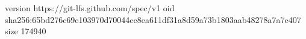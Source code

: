 version https://git-lfs.github.com/spec/v1
oid sha256:65bd276c69c103970d70044cc8ea611df31a8d59a73b1803aab48278a7a7e407
size 174940
